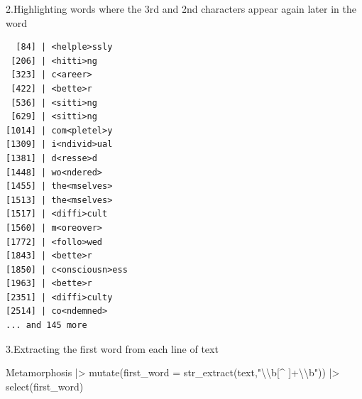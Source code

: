 \documentclass[
  letterpaper,
  DIV=11,
  numbers=noendperiod]{scrartcl}
\newenvironment{Shaded}{\begin{snugshade}}{\end{snugshade}}
\newcommand{\AttributeTok}[1]{\textcolor[rgb]{0.40,0.45,0.13}{#1}}
\newcommand{\FunctionTok}[1]{\textcolor[rgb]{0.28,0.35,0.67}{#1}}
\newcommand{\NormalTok}[1]{\textcolor[rgb]{0.00,0.23,0.31}{#1}}
\newcommand{\SpecialCharTok}[1]{\textcolor[rgb]{0.37,0.37,0.37}{#1}}
\newcommand{\StringTok}[1]{\textcolor[rgb]{0.13,0.47,0.30}{#1}}
\begin{document}
2.Highlighting words where the 3rd and 2nd characters appear again later
in the word

\begin{Shaded}
\end{Shaded}

\begin{verbatim}
  [84] | <helple>ssly
 [206] | <hitti>ng
 [323] | c<areer>
 [422] | <bette>r
 [536] | <sitti>ng
 [629] | <sitti>ng
[1014] | com<pletel>y
[1309] | i<ndivid>ual
[1381] | d<resse>d
[1448] | wo<ndered>
[1455] | the<mselves>
[1513] | the<mselves>
[1517] | <diffi>cult
[1560] | m<oreover>
[1772] | <follo>wed
[1843] | <bette>r
[1850] | c<onsciousn>ess
[1963] | <bette>r
[2351] | <diffi>culty
[2514] | co<ndemned>
... and 145 more
\end{verbatim}

3.Extracting the first word from each line of text

\begin{Shaded}
\begin{Highlighting}[]
\NormalTok{Metamorphosis }\SpecialCharTok{|\textgreater{}}
  \FunctionTok{mutate}\NormalTok{(}\AttributeTok{first\_word =} \FunctionTok{str\_extract}\NormalTok{(text,}\StringTok{"}\SpecialCharTok{\textbackslash{}\textbackslash{}}\StringTok{b[\^{} ]+}\SpecialCharTok{\textbackslash{}\textbackslash{}}\StringTok{b"}\NormalTok{)) }\SpecialCharTok{|\textgreater{}}
  \FunctionTok{select}\NormalTok{(first\_word)}
\end{Highlighting}
\end{Shaded}
\end{document}
